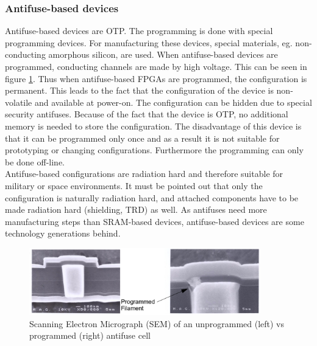 \subsubsection{Antifuse-based devices}
Antifuse-based devices are OTP. The programming is done with special programming devices. For manufacturing these devices, special materials, eg. non-conducting amorphous silicon, are used.\cite{Zeif2011} When antifuse-based devices are programmed, conducting channels are made by high voltage. This can be seen in figure \ref{fig:antifusevorhernachher}. Thus when antifuse-based FPGAs are programmed, the configuration is permanent. This leads to the fact that the configuration of the device is non-volatile and available at power-on. The configuration can be hidden due to special security antifuses. Because of the fact that the device is OTP, no additional memory is needed to store the configuration. The disadvantage of this device is that it can be programmed only once and as a result it is not suitable for prototyping or changing configurations. Furthermore the programming can only be done off-line.\\
Antifuse-based configurations are radiation hard and therefore suitable for military or space environments.\cite{Maxfield2009} It must be pointed out that only the configuration is naturally radiation hard, and attached components have to be made radiation hard (shielding, TRD) as well. As antifuses need more manufacturing steps than SRAM-based devices, antifuse-based devices are some technology generations behind.
\begin{figure}[htbp]
\begin{center}
\includegraphics[width=10cm,keepaspectratio=true]{bilder/png/antifusevorhernachher}
\caption{Scanning Electron Micrograph (SEM) of an unprogrammed (left) vs programmed (right) antifuse cell \cite{Qui16}}
\label{fig:antifusevorhernachher}
\end{center}
\end{figure}
